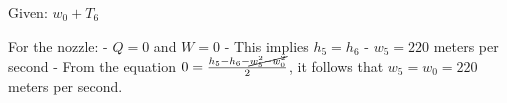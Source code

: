 Given: \( w_0 + T_6 \)

For the nozzle:
- \( Q = 0 \) and \( W = 0 \)
- This implies \( h_5 = h_6 \)
- \( w_5 = 220 \) meters per second
- From the equation \( 0 = \frac{h_5 - h_6 - \cancel{w_5^2 - w_0^2}}{2} \), it follows that \( w_5 = w_0 = 220 \) meters per second.
